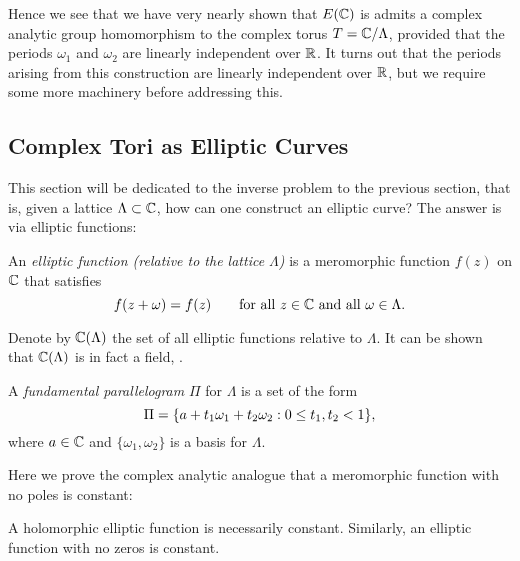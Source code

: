 Hence we see that we have very nearly shown that $E(\mathbb{C})$ is admits a complex analytic group homomorphism to the complex torus $T = \mathbb{C}/\Lambda$, provided that the periods $\omega_{1}$ and $\omega_{2}$ are linearly independent over $\mathbb{R}$. It turns out that the periods arising from this construction are linearly independent over $\mathbb{R}$, but we require some more machinery before addressing this.

\subsection{Complex Tori as Elliptic Curves}

This section will be dedicated to the inverse problem to the previous section, that is, given a lattice $\Lambda \subset \mathbb{C}$, how can one construct an elliptic curve? The answer is via elliptic functions:\\

\begin{defn}\cite{Silverman_2009}
	An \emph{elliptic function (relative to the lattice $\Lambda$)} is a meromorphic function $f(z)$ on $\mathbb{C}$ that satisfies
	\begin{equation*}
		f(z + \omega) = f(z)\qquad\text{for all } z \in \mathbb{C}\text{ and all } \omega \in \Lambda.
	\end{equation*}
\end{defn}
Denote by $\mathbb{C}(\Lambda)$ the set of all elliptic functions relative to $\Lambda$. It can be shown that $\mathbb{C}(\Lambda)$ is in fact a field, \cite{Silverman_2009}.\\

\begin{defn}
	A \emph{fundamental parallelogram} $\Pi$ for $\Lambda$ is a set of the form
	\begin{equation*}
		\Pi = \{ a + t_{1}\omega_{1} + t_{2}\omega_{2}: 0 \leq t_{1}, t_{2} <1\},
	\end{equation*}
	where $a \in \mathbb{C}$ and $\{\omega_{1}, \omega_{2}\}$ is a basis for $\Lambda$.
\end{defn}

Here we prove the complex analytic analogue that a meromorphic function with no poles is constant:\\

\begin{prop}
	A holomorphic elliptic function is necessarily constant. Similarly, an elliptic function with no zeros is constant.
\end{prop}

